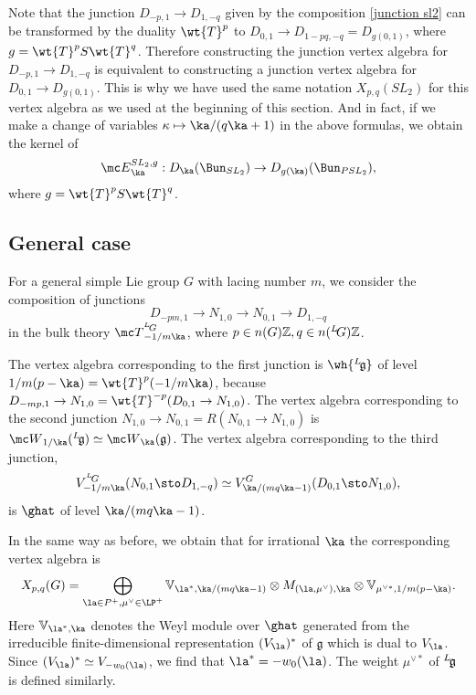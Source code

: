 \documentclass[11pt,reqno]{amsart}
\theoremstyle{plain}
\numberwithin{equation}{section}
\newcommand{\Z}{\mathbb{Z}}
\newcommand{\g}{\mathfrak{g}}
\def\neg{\negthinspace}
\def\lg{{}^L\neg\g}
\def\hlg{\wh{\lg}}
\def\LG{{}^L\neg G}
\theoremstyle{definition}
\begin{document}
Note that the junction $D_{-p,1} \to D_{1,-q}$ given by the
composition \eqref{junction sl2} can be transformed by the duality
$\wt{T}^{p}$ to $D_{0,1} \to D_{1-pq,-q} = D_{g(0,1)}$, where $g =
\wt{T}^{p} S \wt{T}^q$. Therefore constructing the junction vertex
algebra for $D_{-p,1} \to D_{1,-q}$ is equivalent to constructing a
junction vertex algebra for $D_{0,1} \to D_{g(0,1)}$. This is why we
have used the same notation $X_{p,q}(SL_2)$ for this vertex algebra as
we used at the beginning of this section. And in fact, if we make a
change of variables $\kappa \mapsto \ka/(q\ka+1)$ in the above
formulas, we obtain the kernel of
$$
{\mc E}^{SL_2,g}_{\ka}: D_\ka(\Bun_{SL_2}) \to
D_{g(\ka)}(\Bun_{PSL_2}),
$$
where $g = \wt{T}^{p} S \wt{T}^q$.

\subsection{General case}    \label{fam gen}

For a general simple Lie group $G$ with lacing number $m$, we consider
the composition of junctions
$$
D_{-pm,1} \to N_{1,0} \to N_{0,1} \to D_{1,-q}
$$
in the bulk theory ${\mc T}^{\LG}_{-1/m\ka}$, where $p \in n(G)\Z, q
\in n(\LG)\Z$.

The vertex algebra corresponding to the first junction is $\hlg$ of
level $1/m(p-\ka) = \wt{T}^{p}(-1/m\ka)$, because $D_{-mp,1} \to
N_{1,0} = \wt{T}^{-p}(D_{0,1} \to N_{1,0})$. The vertex algebra
corresponding to the second junction $N_{1,0} \to N_{0,1} = R(N_{0,1}
\to N_{1,0})$ is ${\mc W}_{1/\ka}(\lg) \simeq {\mc W}_\ka(\g)$. The
vertex algebra corresponding to the third junction,
$$
V^{\LG}_{-1/m\ka}(N_{0,1} \sto D_{1,-q}) \simeq
V^G_{\ka/(mq\ka-1)}(D_{0,1} \sto N_{1,0}),
$$
is $\ghat$ of level $\ka/(mq\ka-1)$.

In the same way as before, we obtain that for irrational $\ka$ the
corresponding vertex algebra is
\begin{equation}   \label{XpqG}
X_{p,q}(G) = \bigoplus_{\la \in P^+,\mu^\vee \in \LP^+} {\mathbb
  V}_{\la^*,\ka/(mq\ka-1)} \otimes M_{(\la,\mu^\vee),\ka} \otimes {\mathbb
  V}_{\mu^{\vee *},1/m(p-\ka)}.
\end{equation}
Here ${\mathbb V}_{\la^*,\ka}$ denotes the Weyl module over $\ghat$
generated from the irreducible finite-dimensional representation
$(V_\la)^*$ of $\g$ which is dual to $V_\la$. Since $(V_\la)^* \simeq
V_{-w_0(\la)}$, we find that $\la^*=-w_0(\la)$. The weight $\mu^{\vee
  *}$ of $\lg$ is defined similarly.
\end{document}
